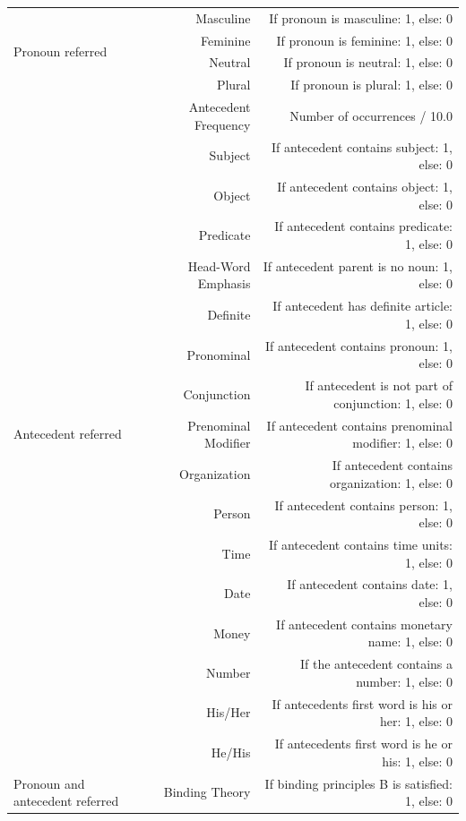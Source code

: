 \begin{table}[p]
{\begin{tabular}{| l |r | r |}
	\multirow{4}{1.3cm}{Pronoun referred} & Masculine & If pronoun is masculine: 1, else: 0 \\ \cline{2-3}
 	& Feminine &  If pronoun is feminine: 1, else: 0 \\	\cline{2-3}
	& Neutral &  If pronoun is neutral: 1, else: 0 \\	\cline{2-3}
	 & Plural & If pronoun is plural: 1, else: 0 \\ \hline
	\hline
	\multirow{17}{1.3cm}{Antecedent referred} & Antecedent Frequency & Number of occurrences / 10.0 \\ \cline{2-3}
 	& Subject &  If antecedent contains subject: 1, else: 0 \\ \cline{2-3}
	& Object &   If antecedent contains object: 1, else: 0 \\	\cline{2-3}
	& Predicate &   If antecedent contains predicate: 1, else: 0 \\ \cline{2-3}
	& Head-Word Emphasis &  If antecedent parent is no noun: 1, else: 0 \\	\cline{2-3}
	& Definite & If antecedent has definite article: 1, else: 0 \\ \cline{2-3}	
	& Pronominal &  If antecedent contains pronoun: 1, else: 0 \\	\cline{2-3}
	& Conjunction &  If antecedent is not part of conjunction: 1, else: 0 \\	\cline{2-3}
	& Prenominal Modifier & If antecedent contains prenominal modifier: 1, else: 0 \\ \cline{2-3}
	& Organization & If antecedent contains organization: 1, else: 0 \\ \cline{2-3}
	& Person & If antecedent contains person: 1, else: 0 \\ \cline{2-3}
	& Time & If antecedent contains time units: 1, else: 0 \\ \cline{2-3}
	& Date & If antecedent contains date: 1, else: 0 \\ \cline{2-3}
	& Money & If antecedent contains monetary name: 1, else: 0 \\ \cline{2-3}
	& Number & If the antecedent contains a number: 1, else: 0 \\ \cline{2-3}
	& His/Her & If antecedents first word is his or her: 1, else: 0 \\ \cline{2-3}
	& He/His & If antecedents first word is he or his: 1, else: 0 \\  \hline
	\hline
	\multirow{9}{1.3cm}{Pronoun and antecedent referred} & Binding Theory & If binding principles B is satisfied: 1, else: 0 \\ \cline{2-3}

\end{tabular}}
\end{table}
